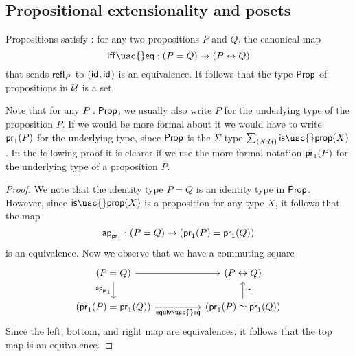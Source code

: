 \subsection{Propositional extensionality and posets}

\begin{thm}\label{thm:propositional-extensionality}
  Propositions satisfy :
  for any two propositions $P$ and $Q$, the canonical map
  \begin{equation*}
    \mathsf{iff\usc{}eq}:(P=Q)\to (P\leftrightarrow Q)
  \end{equation*}
  that sends $\mathsf{refl}_{P}$ to $(\mathsf{id}_{},\mathsf{id}_{})$ is an equivalence. It follows that the type $\mathsf{Prop}$ of propositions in $\mathcal{U}$ is a set.
\end{thm}

Note that for any $P:\mathsf{Prop}$, we usually also write $P$ for the underlying type of the proposition $P$. If we would be more formal about it we would have to write $\mathsf{pr}_{1}(P)$ for the underlying type, since $\mathsf{Prop}$ is the $\Sigma$-type $\sm{X:\UU}\mathsf{is\usc{}prop}(X)$. In the following proof it is clearer if we use the more formal notation $\mathsf{pr}_{1}(P)$ for the underlying type of a proposition $P$.

\begin{proof}
  We note that the identity type $P=Q$ is an identity type in $\mathsf{Prop}$. However, since $\mathsf{is\usc{}prop}(X)$ is a proposition for any type $X$, it follows that the map
  \begin{equation*}
    \mathsf{ap}_{\mathsf{pr}_{1}} : (P = Q) \to (\mathsf{pr}_{1}(P) = \mathsf{pr}_{1}(Q))
  \end{equation*}
  is an equivalence. Now we observe that we have a commuting square
  \begin{equation*}
    \begin{tikzcd}[column sep=huge]
      (P=Q) \arrow[d,swap,"\apfunc{\proj 1}"] \arrow[r] & (P\leftrightarrow Q) \\
      (\proj 1(P)=\proj 1(Q)) \arrow[r,swap,"\mathsf{equiv\usc{}eq}"] & (\proj 1(P)\simeq\proj 1(Q)) \arrow[u,swap,"\simeq"]
    \end{tikzcd}
  \end{equation*}
  Since the left, bottom, and right map are equivalences, it follows that the top map is an equivalence.
\end{proof}

